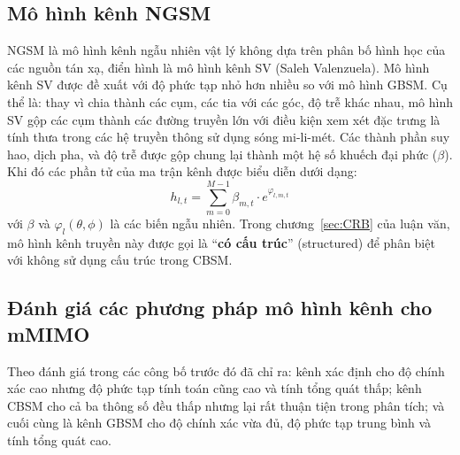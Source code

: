 \subsection{Mô hình kênh NGSM}
\label{sec:NGSM}
NGSM là mô hình kênh ngẫu nhiên vật lý không dựa trên phân bố hình học của các nguồn tán xạ, điển hình là mô hình kênh SV (Saleh Valenzuela).
Mô hình kênh SV được đề xuất với độ phức tạp nhỏ hơn nhiều so với mô hình GBSM. 
Cụ thể là: thay vì chia thành các cụm, các tia với các góc, độ trễ khác nhau, mô hình SV gộp các cụm thành các đường truyền lớn với điều kiện xem xét đặc trưng là tính thưa trong các hệ truyền thông sử dụng sóng mi-li-mét. Các thành phần suy hao, dịch pha, và độ trễ được gộp chung lại thành một hệ số khuếch đại phức ($\beta$). Khi đó các phần tử của ma trận kênh được biểu diễn dưới dạng:
\begin{equation}
    h_{l, t} = \sum\limits_{m=0}^{M-1} \beta_{m, t} \cdot e^{\varphi_{l, m, t}} 
\end{equation}
với $\beta$ và $\varphi_l(\theta, \phi)$  là các biến ngẫu nhiên.
Trong chương~\ref{sec:CRB} của luận văn, mô hình kênh truyền này được gọi là ``\textbf{có cấu trúc}'' (structured) để phân biệt với không sử dụng cấu trúc trong CBSM.


\subsection{Đánh giá các phương pháp mô hình kênh cho mMIMO}

Theo đánh giá trong các công bố trước đó đã chỉ ra: kênh xác định cho độ chính xác cao nhưng độ phức tạp tính toán cũng cao và tính tổng quát thấp; kênh CBSM cho cả ba thông số đều thấp nhưng lại rất thuận tiện trong phân tích; và cuối cùng là kênh GBSM cho độ chính xác vừa đủ, độ phức tạp trung bình và tính tổng quát cao.

